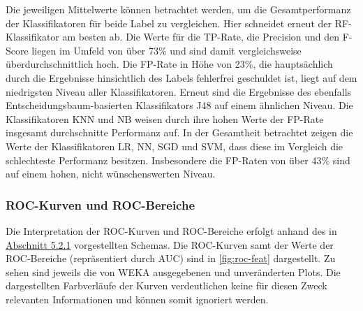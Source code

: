 Die jeweiligen Mittelwerte können betrachtet werden, um die Gesamtperformanz der Klassifikatoren für beide Label zu vergleichen. Hier schneidet erneut der RF-Klassifikator am besten ab. Die Werte für die TP-Rate, die Precision und den F-Score liegen im Umfeld von über 73\% und sind damit vergleichsweise überdurchschnittlich hoch. Die FP-Rate in Höhe von 23\%, die hauptsächlich durch die Ergebnisse hinsichtlich des Labels \glqq fehlerfrei\grqq{} geschuldet ist, liegt auf dem niedrigsten Niveau aller Klassifikatoren. Erneut sind die Ergebnisse des ebenfalls Entscheidungsbaum-basierten Klassifikators J48 auf einem ähnlichen Niveau. Die Klassifikatoren KNN und NB weisen durch ihre hohen Werte der FP-Rate insgesamt durchschnitte Performanz auf. In der Gesamtheit betrachtet zeigen die Werte der Klassifikatoren LR, NN, SGD und SVM, dass diese im Vergleich die schlechteste Performanz besitzen. Insbesondere die FP-Raten von über 43\% sind auf einem hohen, nicht wünschenswerten Niveau. 

\subsubsection*{ROC-Kurven und ROC-Bereiche}

Die Interpretation der ROC-Kurven und ROC-Bereiche erfolgt anhand des in \hyperref[roc-def]{Abschnitt 5.2.1} vorgestellten Schemas. Die ROC-Kurven samt der Werte der ROC-Bereiche (repräsentiert durch \glqq AUC\grqq{}) sind in \autoref{fig:roc-feat}  dargestellt. Zu sehen sind jeweils die von WEKA ausgegebenen und unveränderten Plots. Die dargestellten Farbverläufe der Kurven verdeutlichen keine für diesen Zweck relevanten Informationen und können somit ignoriert werden.

